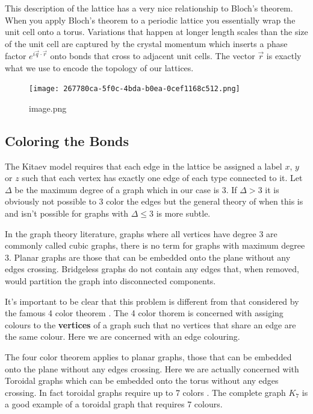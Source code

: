 This description of the lattice has a very nice relationship to Bloch's
theorem. When you apply Bloch's theorem to a periodic lattice you
essentially wrap the unit cell onto a torus. Variations that happen at
longer length scales than the size of the unit cell are captured by the
crystal momentum which inserts a phase factor
\(e^{i \vec{q}\cdot\vec{r}}\) onto bonds that cross to adjacent unit
cells. The vector \(\vec{r}\) is exactly what we use to encode the
topology of our lattices.

\begin{fignos:no-prefix-figure-caption}

\begin{figure}
\centering
\texttt{[image: 267780ca-5f0c-4bda-b0ea-0cef1168c512.png]}
\caption{image.png}
\end{figure}

\end{fignos:no-prefix-figure-caption}

\hypertarget{coloring-the-bonds}{%
\subsection{Coloring the Bonds}\label{coloring-the-bonds}}

The Kitaev model requires that each edge in the lattice be assigned a
label \(x\), \(y\) or \(z\) such that each vertex has exactly one edge
of each type connected to it. Let \(\Delta\) be the maximum degree of a
graph which in our case is 3. If \(\Delta > 3\) it is obviously not
possible to 3 color the edges but the general theory of when this is and
isn't possible for graphs with \(\Delta \leq 3\) is more subtle.

In the graph theory literature, graphs where all vertices have degree 3
are commonly called cubic graphs, there is no term for graphs with
maximum degree 3. Planar graphs are those that can be embedded onto the
plane without any edges crossing. Bridgeless graphs do not contain any
edges that, when removed, would partition the graph into disconnected
components.

It's important to be clear that this problem is different from that
considered by the famous 4 color theorem
\textcite{appelEveryPlanarMap1989} . The 4 color thorem is concerned
with assiging colours to the \textbf{vertices} of a graph such that no
vertices that share an edge are the same colour. Here we are concerned
with an edge colouring.

The four color theorem applies to planar graphs, those that can be
embedded onto the plane without any edges crossing. Here we are actually
concerned with Toroidal graphs which can be embedded onto the torus
without any edges crossing. In fact toroidal graphs require up to 7
colors \textcite{heawoodMapColouringTheorems} . The complete graph
\(K_7\) is a good example of a toroidal graph that requires 7 colours.

